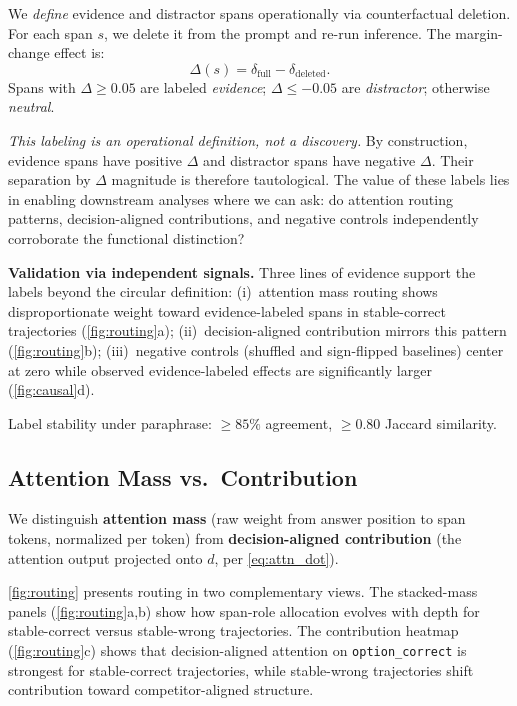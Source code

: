 \documentclass{article}
\begin{document}
We \emph{define} evidence and distractor spans operationally via counterfactual deletion.  For each span $s$, we delete it from the prompt and re-run inference.  The margin-change effect is:
\begin{equation}
  \Delta(s) = \delta_{\mathrm{full}} - \delta_{\mathrm{deleted}}.
  \label{eq:span_effect}
\end{equation}
Spans with $\Delta \geq 0.05$ are labeled \emph{evidence}; $\Delta \leq -0.05$ are \emph{distractor}; otherwise \emph{neutral}.

\emph{This labeling is an operational definition, not a discovery.}  By construction, evidence spans have positive $\Delta$ and distractor spans have negative $\Delta$.  Their separation by $\Delta$ magnitude is therefore tautological.  The value of these labels lies in enabling downstream analyses where we can ask: do attention routing patterns, decision-aligned contributions, and negative controls independently corroborate the functional distinction?

\textbf{Validation via independent signals.}  Three lines of evidence support the labels beyond the circular definition: (i)~attention mass routing shows disproportionate weight toward evidence-labeled spans in stable-correct trajectories (\cref{fig:routing}a); (ii)~decision-aligned contribution mirrors this pattern (\cref{fig:routing}b); (iii)~negative controls (shuffled and sign-flipped baselines) center at zero while observed evidence-labeled effects are significantly larger (\cref{fig:causal}d).

Label stability under paraphrase: $\geq 85\%$ agreement, $\geq 0.80$ Jaccard similarity.

\subsection{Attention Mass vs.\ Contribution}

We distinguish \textbf{attention mass} (raw weight from answer position to span tokens, normalized per token) from \textbf{decision-aligned contribution} (the attention output projected onto $d$, per \cref{eq:attn_dot}).

\cref{fig:routing} presents routing in two complementary views.  The stacked-mass panels (\cref{fig:routing}a,b) show how span-role allocation evolves with depth for stable-correct versus stable-wrong trajectories.  The contribution heatmap (\cref{fig:routing}c) shows that decision-aligned attention on \texttt{option\_correct} is strongest for stable-correct trajectories, while stable-wrong trajectories shift contribution toward competitor-aligned structure.
\end{document}
